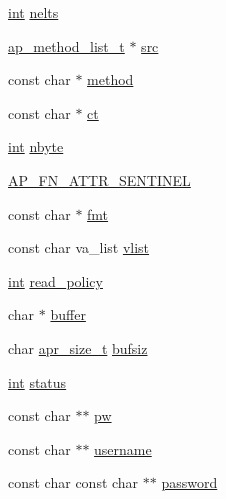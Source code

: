\begin{DoxyCompactItemize}
\item 
\hyperlink{pcre_8txt_a42dfa4ff673c82d8efe7144098fbc198}{int} \hyperlink{group__APACHE__CORE__PROTO_ga3f892b271cc0564b2d8e9536a96abd7c}{nelts}
\item 
\hyperlink{structap__method__list__t}{ap\+\_\+method\+\_\+list\+\_\+t} $\ast$ \hyperlink{group__APACHE__CORE__PROTO_ga3250c7d76063d957a24f2ecbb3d93c2c}{src}
\item 
const char $\ast$ \hyperlink{group__APACHE__CORE__PROTO_ga8b44a03925325ceaf2de7b079b1541a1}{method}
\item 
const char $\ast$ \hyperlink{group__APACHE__CORE__PROTO_ga7e93f988a62cb0584f3f8eeebdd32e4b}{ct}
\item 
\hyperlink{pcre_8txt_a42dfa4ff673c82d8efe7144098fbc198}{int} \hyperlink{group__APACHE__CORE__PROTO_ga19a56d6f9dcf813c74420f84a3d1c062}{nbyte}
\item 
\hyperlink{group__APACHE__CORE__PROTO_ga6b0ec9d6c145a38da4ccf06941af8d97}{A\+P\+\_\+\+F\+N\+\_\+\+A\+T\+T\+R\+\_\+\+S\+E\+N\+T\+I\+N\+EL}
\item 
const char $\ast$ \hyperlink{group__APACHE__CORE__PROTO_ga381d684d94e6e91dee650357e8f02fa8}{fmt}
\item 
const char va\+\_\+list \hyperlink{group__APACHE__CORE__PROTO_ga5c9cb20591e8d38a4c372c544d01a14e}{vlist}
\item 
\hyperlink{pcre_8txt_a42dfa4ff673c82d8efe7144098fbc198}{int} \hyperlink{group__APACHE__CORE__PROTO_ga92179f9948688ca8144f0d3bff73aec1}{read\+\_\+policy}
\item 
char $\ast$ \hyperlink{group__APACHE__CORE__PROTO_gabd91b1aab0a10c5027ca2eb5577f759f}{buffer}
\item 
char \hyperlink{group__apr__platform_gaaa72b2253f6f3032cefea5712a27540e}{apr\+\_\+size\+\_\+t} \hyperlink{group__APACHE__CORE__PROTO_gab5121d4d91ca81860ed7c296210087f0}{bufsiz}
\item 
\hyperlink{pcre_8txt_a42dfa4ff673c82d8efe7144098fbc198}{int} \hyperlink{group__APACHE__CORE__PROTO_ga6e27f49150e9a14580fb313cc2777e00}{status}
\item 
const char $\ast$$\ast$ \hyperlink{group__APACHE__CORE__PROTO_ga4b22922ccb91d71d170bf2bbca3d241e}{pw}
\item 
const char $\ast$$\ast$ \hyperlink{group__APACHE__CORE__PROTO_ga5389d939c3316982842a29d3694f2e23}{username}
\item 
const char const char $\ast$$\ast$ \hyperlink{group__APACHE__CORE__PROTO_ga69b970a42043daa64861aba281a1e6f0}{password}
\item 
$$
\end{DoxyCompactItemize}

